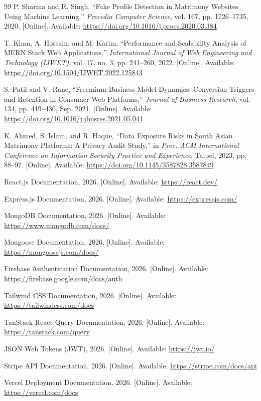 \documentclass[conference]{IEEEtran}
\begin{document}
\begin{thebibliography}{99}
P. Sharma and R. Singh, ``Fake Profile Detection in Matrimony Websites Using Machine Learning,'' \textit{Procedia Computer Science}, vol. 167, pp. 1726--1735, 2020. [Online]. Available: \url{https://doi.org/10.1016/j.procs.2020.03.384}

T. Khan, A. Hossain, and M. Karim, ``Performance and Scalability Analysis of MERN Stack Web Applications,'' \textit{International Journal of Web Engineering and Technology (IJWET)}, vol. 17, no. 3, pp. 241--260, 2022. [Online]. Available: \url{https://doi.org/10.1504/IJWET.2022.125843}

S. Patil and V. Rane, ``Freemium Business Model Dynamics: Conversion Triggers and Retention in Consumer Web Platforms,'' \textit{Journal of Business Research}, vol. 134, pp. 419--430, Sep. 2021. [Online]. Available: \url{https://doi.org/10.1016/j.jbusres.2021.05.041}

K. Ahmed, S. Islam, and R. Haque, ``Data Exposure Risks in South Asian Matrimony Platforms: A Privacy Audit Study,'' in \textit{Proc. ACM International Conference on Information Security Practice and Experience}, Taipei, 2023, pp. 88--97. [Online]. Available: \url{https://doi.org/10.1145/3587828.3587849}

React.js Documentation, 2026. [Online]. Available: \url{https://react.dev/}

Express.js Documentation, 2026. [Online]. Available: \url{https://expressjs.com/}

MongoDB Documentation, 2026. [Online]. Available: \url{https://www.mongodb.com/docs/}

Mongoose Documentation, 2026. [Online]. Available: \url{https://mongoosejs.com/docs/}

Firebase Authentication Documentation, 2026. [Online]. Available: \url{https://firebase.google.com/docs/auth}

Tailwind CSS Documentation, 2026. [Online]. Available: \url{https://tailwindcss.com/docs}

TanStack React Query Documentation, 2026. [Online]. Available: \url{https://tanstack.com/query}

JSON Web Tokens (JWT), 2026. [Online]. Available: \url{https://jwt.io/}

Stripe API Documentation, 2026. [Online]. Available: \url{https://stripe.com/docs/api}

Vercel Deployment Documentation, 2026. [Online]. Available: \url{https://vercel.com/docs}


\end{thebibliography}
\end{document}
